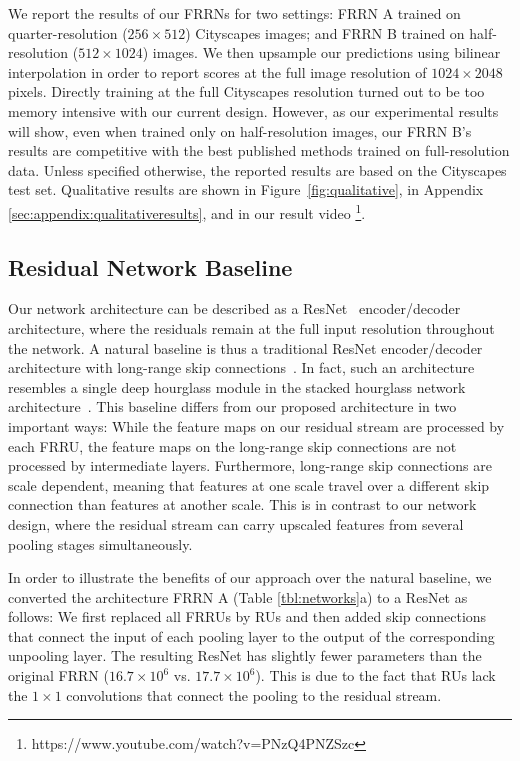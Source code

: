 \documentclass[10pt,twocolumn,letterpaper]{article}
\begin{document}
We report the results of our FRRNs for two settings: FRRN A trained on quarter-resolution ($256 \times 512$) Cityscapes images; and FRRN B trained on half-resolution ($512 \times 1024$) images. 
We then upsample our predictions using bilinear interpolation in order to report scores at the full image resolution of $1024 \times 2048$ pixels.
Directly training at the full Cityscapes resolution turned out to be too memory intensive with our current design. However, as our experimental results will show, even when trained only on half-resolution images, our FRRN B's results are competitive with the best published methods trained on full-resolution data.
Unless specified otherwise, the reported results are based on the Cityscapes test set. Qualitative results are shown in Figure~\ref{fig:qualitative}, in Appendix \ref{sec:appendix:qualitativeresults}, and in our result video \footnote{https://www.youtube.com/watch?v=PNzQ4PNZSzc}.

\subsection{Residual Network Baseline}
Our network architecture can be described as a ResNet~\cite{He16CVPR} encoder/decoder architecture, where the residuals remain at the full input resolution throughout the network.
A natural baseline is thus a traditional ResNet encoder/decoder architecture with long-range skip connections~\cite{Long15CVPR,Noh15ICCV}.
In fact, such an architecture resembles a single deep hourglass module in the stacked hourglass network architecture~\cite{Newell16ECCV}.
This baseline differs from our proposed architecture in two important ways:
While the feature maps on our residual stream are processed by each FRRU, the feature maps on the long-range skip connections are not processed by intermediate layers.
Furthermore, long-range skip connections are scale dependent, meaning that features at one scale travel over a different skip connection than features at another scale.
This is in contrast to our network design, where the residual stream can carry upscaled features from several pooling stages simultaneously.

In order to illustrate the benefits of our approach over the natural baseline, we converted the architecture FRRN A (Table \ref{tbl:networks}a) to a ResNet as follows:
We first replaced all \mbox{FRRUs} by RUs and then added skip connections that connect the input of each pooling layer to the output of the corresponding unpooling layer.
The resulting ResNet has slightly fewer parameters than the original FRRN ($16.7\times 10^6$ vs. $17.7\times 10^6$).
This is due to the fact that RUs lack the $1\times1$ convolutions that connect the pooling to the residual stream.
\end{document}
